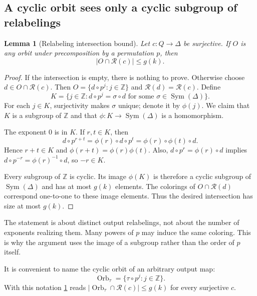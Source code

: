 \documentclass[11pt,a4paper]{article}
\numberwithin{equation}{section}
\newtheorem{lemma}[theorem]{Lemma}
\theoremstyle{definition}
\theoremstyle{remark}
\newcommand{\Z}{\mathbb Z}
\newcommand{\D}{\Delta}
\newcommand{\Sym}{\operatorname{Sym}}
\newcommand{\Orb}{\operatorname{Orb}}
\begin{document}
\subsection{A cyclic orbit sees only a cyclic subgroup of relabelings}

\begin{lemma}[Relabeling intersection bound]\label{lem:intersection}
Let $c:Q\to\D$ be surjective. If $O$ is any orbit under precomposition by a
permutation $p$, then
\[
 |O\cap\mathcal R(c)|\le g(k).
\]
\end{lemma}
\begin{proof}
If the intersection is empty, there is nothing to prove. Otherwise choose
$d\in O\cap\mathcal R(c)$. Then $O=\{d\circ p^j:j\in\Z\}$ and
$\mathcal R(d)=\mathcal R(c)$. Define
\[
 K=\{j\in\Z:d\circ p^j=\sigma\circ d
       \text{ for some }\sigma\in\Sym(\D)\}.
\]
For each $j\in K$, surjectivity makes $\sigma$ unique; denote it by
$\phi(j)$. We claim that $K$ is a subgroup of $\Z$ and that
$\phi:K\to\Sym(\D)$ is a homomorphism.

The exponent $0$ is in $K$. If $r,t\in K$, then
\[
 d\circ p^{r+t}
 =\phi(r)\circ d\circ p^t
 =\phi(r)\circ\phi(t)\circ d.
\]
Hence $r+t\in K$ and $\phi(r+t)=\phi(r)\phi(t)$. Also,
$d\circ p^r=\phi(r)\circ d$ implies
$d\circ p^{-r}=\phi(r)^{-1}\circ d$, so $-r\in K$.

Every subgroup of $\Z$ is cyclic. Its image $\phi(K)$ is therefore a cyclic
subgroup of $\Sym(\D)$ and has at most $g(k)$ elements. The colorings of
$O\cap\mathcal R(d)$ correspond one-to-one to these image elements. Thus
the desired intersection has size at most $g(k)$.
\end{proof}

The statement is about distinct output relabelings, not about the number of
exponents realizing them. Many powers of $p$ may induce the same coloring.
This is why the argument uses the image of a subgroup rather than the order
of $p$ itself.

It is convenient to name the cyclic orbit of an arbitrary output map:
\begin{equation}\label{eq:orbnotation}
 \Orb_\tau=\{\tau\circ p^j:j\in\Z\}.
\end{equation}
With this notation \cref{lem:intersection} reads
$|\Orb_\tau\cap\mathcal R(c)|\le g(k)$ for every surjective $c$.
\end{document}
